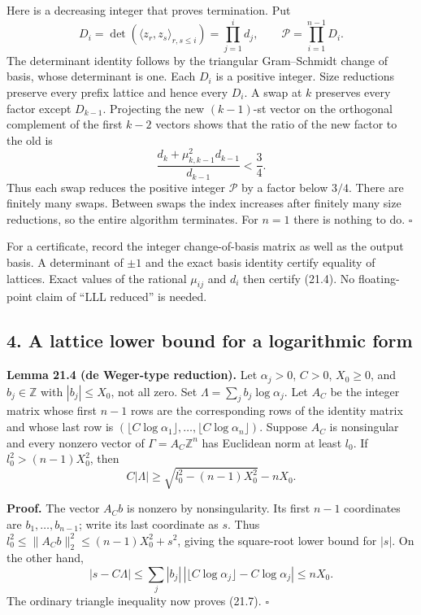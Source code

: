 \documentclass[
  11pt,
  a4paper,
]{article}
\begin{document}
Here is a decreasing integer that proves termination. Put \[
 D_i=\det(\langle z_r,z_s\rangle_{r,s\le i})
      =\prod_{j=1}^i d_j,\qquad
 \mathcal P=\prod_{i=1}^{n-1}D_i.
 \tag{21.6}
\] The determinant identity follows by the triangular Gram--Schmidt
change of basis, whose determinant is one. Each \(D_i\) is a positive
integer. Size reductions preserve every prefix lattice and hence every
\(D_i\). A swap at \(k\) preserves every factor except \(D_{k-1}\).
Projecting the new \((k-1)\)-st vector on the orthogonal complement of
the first \(k-2\) vectors shows that the ratio of the new factor to the
old is \[
 \frac{d_k+\mu_{k,k-1}^2d_{k-1}}{d_{k-1}}<\frac34.
\] Thus each swap reduces the positive integer \(\mathcal P\) by a
factor below \(3/4\). There are finitely many swaps. Between swaps the
index increases after finitely many size reductions, so the entire
algorithm terminates. For \(n=1\) there is nothing to do. \(\square\)

For a certificate, record the integer change-of-basis matrix as well as
the output basis. A determinant of \(\pm1\) and the exact basis identity
certify equality of lattices. Exact values of the rational \(\mu_{ij}\)
and \(d_i\) then certify (21.4). No floating-point claim of ``LLL
reduced'' is needed.

\subsection{4. A lattice lower bound for a logarithmic
form}\label{a-lattice-lower-bound-for-a-logarithmic-form}

\textbf{Lemma 21.4 (de Weger-type reduction).} Let \(\alpha_j>0\),
\(C>0\), \(X_0\ge0\), and \(b_j\in\mathbb Z\) with \(|b_j|\le X_0\), not
all zero. Set \(\Lambda=\sum_jb_j\log\alpha_j\). Let \(A_C\) be the
integer matrix whose first \(n-1\) rows are the corresponding rows of
the identity matrix and whose last row is
\((\lfloor C\log\alpha_1\rfloor,\ldots,
\lfloor C\log\alpha_n\rfloor)\). Suppose \(A_C\) is nonsingular and
every nonzero vector of \(\Gamma=A_C\mathbb Z^n\) has Euclidean norm at
least \(l_0\). If \(l_0^2>(n-1)X_0^2\), then \[
 C|\Lambda|\ge
 \sqrt{l_0^2-(n-1)X_0^2}-nX_0.
 \tag{21.7}
\]

\textbf{Proof.} The vector \(A_Cb\) is nonzero by nonsingularity. Its
first \(n-1\) coordinates are \(b_1,\ldots,b_{n-1}\); write its last
coordinate as \(s\). Thus \(l_0^2\le\|A_Cb\|_2^2\le(n-1)X_0^2+s^2\),
giving the square-root lower bound for \(|s|\). On the other hand, \[
 |s-C\Lambda|
 \le\sum_j|b_j|\,
       |\lfloor C\log\alpha_j\rfloor-C\log\alpha_j|
 \le nX_0.
\] The ordinary triangle inequality now proves (21.7). \(\square\)
\end{document}
